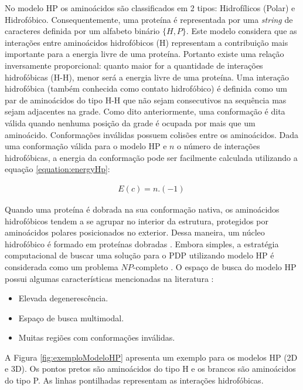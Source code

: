 No modelo HP os aminoácidos são classificados em 2 tipos: Hidrofílicos (Polar) e Hidrofóbico. Consequentemente, uma proteína é representada por uma \textit{string} de caracteres definida por um alfabeto binário $\{H,P\}$. Este modelo considera que as interações entre aminoácidos hidrofóbicos (H) representam a contribuição mais importante para a energia livre de uma proteína. Portanto existe uma relação inversamente proporcional: quanto maior for a quantidade de interações hidrofóbicas (H-H), menor será a energia livre de uma proteína. Uma interação hidrofóbica (também conhecida como contato hidrofóbico) é definida como um par de aminoácidos do tipo H-H que não sejam consecutivos na sequência mas sejam adjacentes na grade.
Como dito anteriormente, uma conformação é dita válida quando nenhuma posição da grade é ocupada por mais que um aminoácido. Conformações inválidas possuem colisões entre os aminoácidos. Dada uma conformação válida para o modelo HP e $n$ o número de interações hidrofóbicas, a energia da conformação pode ser facilmente calculada utilizando a equação \ref{equation:energyHp}: 


\begin{align}
	\label{equation:energyHp}
	E(c) = n. (-1) 
	\
\end{align}


Quando uma proteína é dobrada na sua conformação nativa, os aminoácidos hidrofóbicos tendem a se agrupar no interior da estrutura, protegidos por aminoácidos polares posicionados no exterior. Dessa maneira, um núcleo hidrofóbico é formado em proteínas dobradas \cite{benitez2015algoritmo}. 
Embora simples, a estratégia computacional de buscar uma solução para o PDP utilizando modelo HP é considerada como um problema $NP$-completo \cite{atkins1999intractability, berger1998protein, crescenzi1998complexity}. O espaço de busca do modelo HP possui algumas características mencionadas na literatura \cite{bastolla1997testing, berger1998protein, crescenzi1998complexity, krasnogor1999protein, vendruscolo2000can} :

\begin{itemize}
	\item Elevada degenerescência.
	\item Espaço de busca multimodal.
	\item Muitas regiões com conformações inválidas.
\end{itemize}

A Figura \ref{fig:exemploModeloHP} apresenta um exemplo para os modelos HP (2D e 3D). Os pontos pretos são aminoácidos do tipo H e os brancos são aminoácidos do tipo P. As linhas pontilhadas representam as interações hidrofóbicas.


